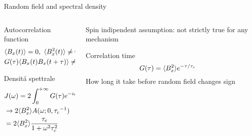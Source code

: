 \begin{frame}{Random field and spectral density}
\begin{columns}[T]
\begin{column}{0.5\textwidth}
\begin{block}{Autocorrelation function}
\begin{align*}
&\langle B_x(t) \rangle=0,\ \langle B_x^2(t) \rangle\neq0\\
&G(\tau)\langle B_x(t)B_x(t+\tau) \rangle\neq0
\end{align*}
\end{block}
\begin{block}{Densit\'a spettrale}
\begin{align*}
&J(\omega)=2\int_0^{+\infty}G(\tau)e^{-i\omega\tau}d\,\tau\\
&\to2\langle B_x^2 \rangle A(\omega;0,{\tau_c}^{-1})\\
&=2\langle B_x^2 \rangle\frac{\tau_c}{1+\omega^2\tau_c^2}
\end{align*}
\end{block}
\end{column}
\begin{column}{0.5\textwidth}
Spin indipendent assumption: not strictly true for any mechanism
\begin{block}{Correlation time}
\begin{equation*}
G(\tau)=\langle B_x^2 \rangle e^{-\tau/\tau_c}
\end{equation*}
How long it take before random field changes sign
\end{block}
\end{column}
\end{columns}
\end{frame}

